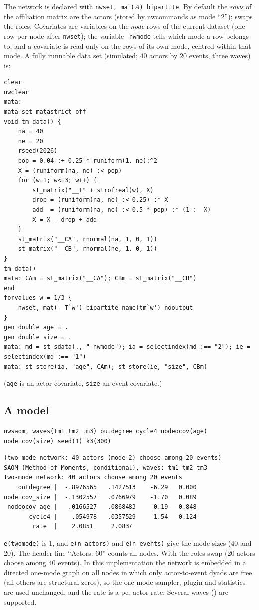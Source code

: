 The network is declared with \texttt{nwset, mat(}$A$\texttt{) bipartite}. By default the \emph{rows} of the affiliation matrix are the actors (stored by nwcommands as mode ``2'');  swaps the roles. Covariates are variables on the \emph{node} rows of the current dataset (one row per node after \texttt{nwset}); the variable \texttt{\_nwmode} tells which mode a row belongs to, and a covariate is read only on the rows of its own mode, centred within that mode. A fully runnable data set (simulated; $40$ actors by $20$ events, three waves) is:

\begin{lstlisting}
clear
nwclear
mata:
mata set matastrict off
void tm_data() {
    na = 40
    ne = 20
    rseed(2026)
    pop = 0.04 :+ 0.25 * runiform(1, ne):^2
    X = (runiform(na, ne) :< pop)
    for (w=1; w<=3; w++) {
        st_matrix("__T" + strofreal(w), X)
        drop = (runiform(na, ne) :< 0.25) :* X
        add  = (runiform(na, ne) :< 0.5 * pop) :* (1 :- X)
        X = X - drop + add
    }
    st_matrix("__CA", rnormal(na, 1, 0, 1))
    st_matrix("__CB", rnormal(ne, 1, 0, 1))
}
tm_data()
mata: CAm = st_matrix("__CA"); CBm = st_matrix("__CB")
end
forvalues w = 1/3 {
    nwset, mat(__T`w') bipartite name(tm`w') nooutput
}
gen double age = .
gen double size = .
mata: md = st_sdata(., "_nwmode"); ia = selectindex(md :== "2"); ie = selectindex(md :== "1")
mata: st_store(ia, "age", CAm); st_store(ie, "size", CBm)
\end{lstlisting}
(\texttt{age} is an actor covariate, \texttt{size} an event covariate.)

\subsection{A model}

\begin{lstlisting}
nwsaom, waves(tm1 tm2 tm3) outdegree cycle4 nodeocov(age) nodeicov(size) seed(1) k3(300)
\end{lstlisting}
\begin{lstlisting}
(two-mode network: 40 actors (mode 2) choose among 20 events)
SAOM (Method of Moments, conditional), waves: tm1 tm2 tm3
Two-mode network: 40 actors choose among 20 events
    outdegree |  -.8976565   .1427513    -6.29   0.000
nodeicov_size |  -.1302557   .0766979    -1.70   0.089
 nodeocov_age |   .0166527   .0868483     0.19   0.848
       cycle4 |    .054978   .0357529     1.54   0.124
        rate  |    2.0851     2.0837
\end{lstlisting}
\texttt{e(twomode)} is 1, and \texttt{e(n\_actors)} and \texttt{e(n\_events)} give the mode sizes (40 and 20). The header line ``Actors: 60'' counts all nodes. With  the roles swap (20 actors choose among 40 events). In this implementation the network is embedded in a directed one-mode graph on all nodes in which only actor-to-event dyads are free (all others are structural zeros), so the one-mode sampler, plugin and statistics are used unchanged, and the rate is a per-actor rate. Several waves () are supported.

